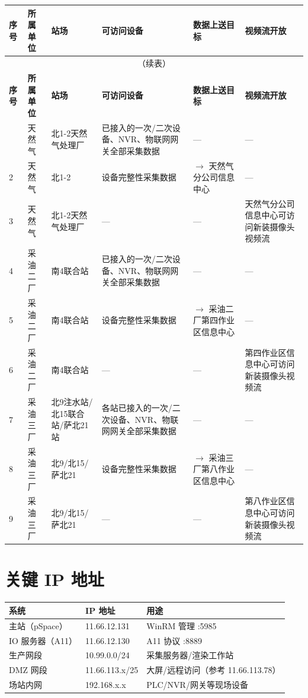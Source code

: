 \documentclass[12pt,a4paper]{ctexart}
\begin{document}
\begin{longtable}{p{0.5cm} p{1.8cm} p{3cm} p{3cm} p{3.5cm} p{2cm}}
\toprule
\textbf{序号} & \textbf{所属单位} & \textbf{站场} & \textbf{可访问设备} & \textbf{数据上送目标} & \textbf{视频流开放} \\
\midrule
\endfirsthead
\multicolumn{6}{c}{\small（续表）} \\
\toprule
\textbf{序号} & \textbf{所属单位} & \textbf{站场} & \textbf{可访问设备} & \textbf{数据上送目标} & \textbf{视频流开放} \\
\midrule
\endhead
\bottomrule
\endfoot
1 & 天然气 & 北1-2天然气处理厂 & 已接入的一次/二次设备、NVR、物联网网关全部采集数据 & — & — \\
2 & 天然气 & 北1-2 & 设备完整性采集数据 & $\rightarrow$ 天然气分公司信息中心 & — \\
3 & 天然气 & 北1-2天然气处理厂 & — & — & 天然气分公司信息中心可访问新装摄像头视频流 \\
4 & 采油二厂 & 南4联合站 & 已接入的一次/二次设备、NVR、物联网网关全部采集数据 & — & — \\
5 & 采油二厂 & 南4联合站 & 设备完整性采集数据 & $\rightarrow$ 采油二厂第四作业区信息中心 & — \\
6 & 采油二厂 & 南4联合站 & — & — & 第四作业区信息中心可访问新装摄像头视频流 \\
7 & 采油三厂 & 北9注水站/北15联合站/萨北21站 & 各站已接入的一次/二次设备、NVR、物联网网关全部采集数据 & — & — \\
8 & 采油三厂 & 北9/北15/萨北21 & 设备完整性采集数据 & $\rightarrow$ 采油三厂第八作业区信息中心 & — \\
9 & 采油三厂 & 北9/北15/萨北21 & — & — & 第八作业区信息中心可访问新装摄像头视频流 \\
\end{longtable}

\section{关键 IP 地址}

\begin{longtable}{p{4cm} p{3cm} p{6cm}}
\toprule
\textbf{系统} & \textbf{IP 地址} & \textbf{用途} \\
\midrule
\endhead
主站（pSpace） & 11.66.12.131 & WinRM 管理 :5985 \\
IO 服务器（A11） & 11.66.12.130 & A11 协议 :8889 \\
生产网段 & 10.99.0.0/24 & 采集服务器/渲染工作站 \\
DMZ 网段 & 11.66.113.x/25 & 大屏/远程访问（参考 11.66.113.78） \\
场站内网 & 192.168.x.x & PLC/NVR/网关等现场设备 \\
\end{longtable}
\end{document}
